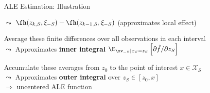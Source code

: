 \documentclass[10pt,compress,t,notes=noshow, xcolor=table]{beamer}
\begin{document}
\begin{framev}[align=top]{ALE Estimation: Illustration}
\begin{itemizeM}
\begin{itemizeS}
$\leadsto$ $\fh(z_{k, S}, \xi_{-S}) - \fh(z_{k-1, S}, \xi_{-S})$ \; (approximates local effect)  %
\end{itemizeS}
\item<2-> Average these finite differences over all observations in each interval \\
$\leadsto$ Approximates \textbf{inner integral} \textcolor{red}{$\E_{\xv_{-S} \mid x_S = z_S} \left[ \partial \hat{f}/\partial z_S \right]$}
\item<2-> Accumulate these averages from $z_0$ to the point of interest $x \in \mathcal{X}_S$ \\
$\leadsto$ Approximates \textbf{outer integral} over $z_S \in [z_{0}, x]$ \\
$\Rightarrow$ uncentered ALE function
\end{itemizeM}
\end{framev}





\end{document}
